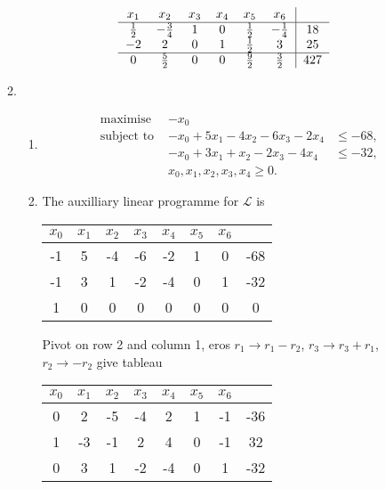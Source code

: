 \documentclass[10pt]{article}
\newcommand*{\La}{\mathcal{L}}
\begin{document}
\begin{enumerate}
\begin{enumerate}
          \begin{align*}
            \begin{tabular}{ c c c c c c | c }
              $x_1$ & $x_2$ & $x_3$ & $x_4$ & $x_5$ & $x_6$ & \\
              \hline
              $\tfrac{1}{2}$ & $-\tfrac{3}{4}$ & 1 & 0 & $\tfrac{1}{2}$ & $-\tfrac{1}{4}$ & $18$ \\
              $-2$ & $2$ & $0$ & $1$ & $\tfrac{1}{2}$ & $3$ & $25$ \\
              \hline
              $0$ & $\tfrac{5}{2}$ & $0$ & $0$ & $\tfrac{9}{2}$ & $\tfrac{3}{2}$ & $427$ \\
            \end{tabular}
          \end{align*}
        \item 
          \begin{enumerate}
            \item
              \begin{align*}
                &\text{maximise   }   &   -x_0 \\
                &\text{subject to   } &  -x_0 + 5x_1 - 4x_2 - 6x_3 - 2x_4 &\leq -68, \\
                &                     &  -x_0 + 3x_1 +  x_2 - 2x_3 - 4x_4 &\leq -32, \\
                &                     & x_0, x_1, x_2, x_3, x_4 \geq 0.&
              \end{align*}
            \item The auxilliary linear programme for $\La$ is

              \begin{tabular}{ c c c c c c c | c }
                $x_0$ & $x_1$ & $x_2$ & $x_3$ & $x_4$ & $x_5$ & $x_6$ & \\
                \hline
                -1 & 5 & -4 & -6 & -2 & 1 & 0 & -68 \\
                -1 & 3 & 1 & -2 & -4 & 0 & 1 & -32 \\
                \hline
                1 & 0 & 0 & 0 & 0 & 0 & 0 & 0 \\
              \end{tabular}

              Pivot on row 2 and column 1, eros
              $r_1 \rightarrow r_1 - r_2$, $r_3 \rightarrow r_3 + r_1$, $r_2
              \rightarrow -r_2$ give tableau

              \begin{tabular}{ c c c c c c c | c }
                $x_0$ & $x_1$ & $x_2$ & $x_3$ & $x_4$ & $x_5$ & $x_6$ & \\
                \hline
                0 & 2 & -5 & -4 & 2 & 1 & -1 & -36 \\
                1 & -3 & -1 & 2 & 4 & 0 & -1 & 32 \\
                \hline
                0 & 3 & 1 & -2 & -4 & 0 & 1 & -32 \\
              \end{tabular}


\end{enumerate}
\end{enumerate}
\end{enumerate}
\end{document}
